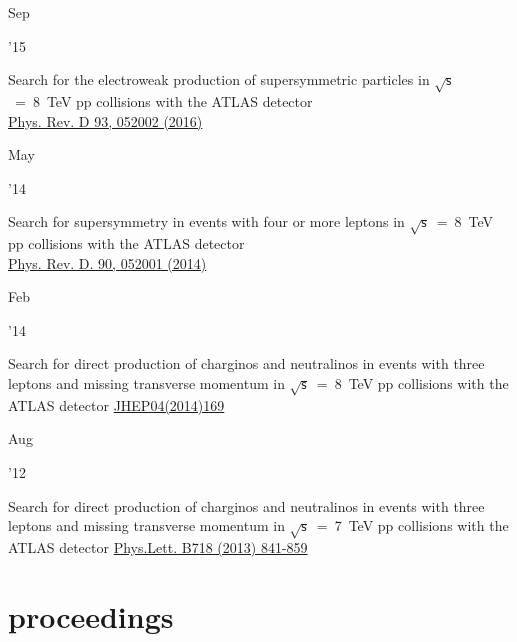 \documentclass[]{cv} %
\begin{document}
\begin{entrylist}
  \entry
  {\parbox[t]{\parboxWidthOne}{Sep}\parbox[t]{\parboxWidthTwo}{\hfill '15}}
  {Search for the electroweak production of supersymmetric particles in
    $\sqrt{\mathsf{s}}$~=~8~TeV pp collisions with the ATLAS detector\\}
    {\href{https://journals.aps.org/prd/abstract/10.1103/PhysRevD.93.052002}{Phys. Rev. D 93, 052002 (2016)}}
  {\vspace*{\spacingPubs}}

  \entry
  {\parbox[t]{\parboxWidthOne}{May}\parbox[t]{\parboxWidthTwo}{\hfill '14}}
  {Search for supersymmetry in events with four or more leptons in $\sqrt{\mathsf{s}}$~=~8~TeV pp collisions with the ATLAS detector\\}
  {\href{https://journals.aps.org/prd/abstract/10.1103/PhysRevD.90.052001}{Phys. Rev. D. 90, 052001 (2014)}}
  {\vspace*{\spacingPubs}}

  \entry
  {\parbox[t]{\parboxWidthOne}{Feb}\parbox[t]{\parboxWidthTwo}{\hfill '14}}
  {Search for direct production of charginos and neutralinos in events with three leptons and missing transverse momentum in $\sqrt{\mathsf{s}}$~=~8~TeV pp collisions with the ATLAS detector}
{\href{https://link.springer.com/article/10.1007\%2FJHEP04\%282014\%29169}{JHEP04(2014)169}}
{\vspace*{\spacingPubs}}

    \entry
    {\parbox[t]{\parboxWidthOne}{Aug}\parbox[t]{\parboxWidthTwo}{\hfill '12}}
    {Search for direct production of charginos and neutralinos in events with three leptons and missing transverse momentum in $\sqrt{\mathsf{s}}$~=~7~TeV pp collisions with the ATLAS detector}
  {\href{https://www.sciencedirect.com/science/article/pii/S037026931201204X?via\%3Dihub}{Phys.Lett. B718 (2013) 841-859}}
  {\vspace*{\spacingPubs}}

\end{entrylist}

\section{proceedings}
\end{document}
